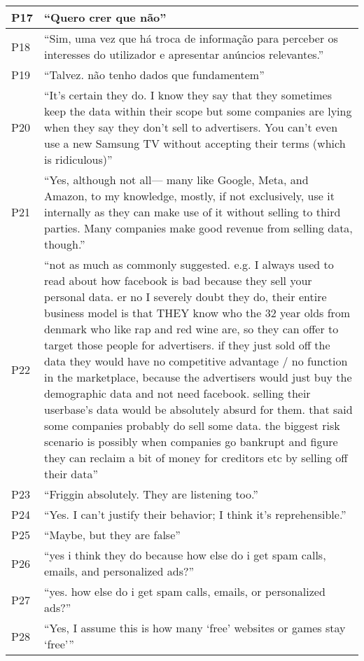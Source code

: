 \begin{longtable}{p{3cm} p{13cm}}
    \hline
    P17 & ``Quero crer que não'' \\
    \hline
    P18 & ``Sim, uma vez que há troca de informação para perceber os interesses do utilizador e apresentar anúncios relevantes.'' \\
    \hline
    P19 & ``Talvez. não tenho dados que fundamentem'' \\
    \hline
    P20 & ``It's certain they do. I know they say that they sometimes keep the data within their scope but some companies are lying when they say they don't sell to advertisers. You can't even use a new Samsung TV without accepting their terms (which is ridiculous)'' \\
    \hline
    P21 & ``Yes, although not all— many like Google, Meta, and Amazon, to my knowledge, mostly, if not exclusively, use it internally as they can make use of it without selling to third parties. Many companies make good revenue from selling data, though.'' \\
    \hline
    P22 & ``not as much as commonly suggested.  e.g. I always used to read about how facebook is bad because they sell your personal data.  er no I severely doubt they do, their entire business model is that THEY know who the 32 year olds from denmark who like rap and red wine are, so they can offer to target those people for advertisers.  if they just sold off the data they would have no competitive advantage / no function in the marketplace, because the advertisers would just buy the demographic data and not need facebook.  selling their userbase's data would be absolutely absurd for them.  that said some companies probably do sell some data.  the biggest risk scenario is possibly when companies go bankrupt and figure they can reclaim a bit of money for creditors etc by selling off their data'' \\
    \hline
    P23 & ``Friggin absolutely. They are listening too.'' \\
    \hline
    P24 & ``Yes. I can't justify their behavior; I think it's reprehensible.'' \\
    \hline
    P25 & ``Maybe, but they are false'' \\
    \hline
    P26 & ``yes i think they do because how else do i get spam calls, emails, and personalized ads?'' \\
    \hline
    P27 & ``yes. how else do i get spam calls, emails, or personalized ads?'' \\
    \hline
    P28 & ``Yes, I assume this is how many `free' websites or games stay `free''' \\

\end{longtable}
